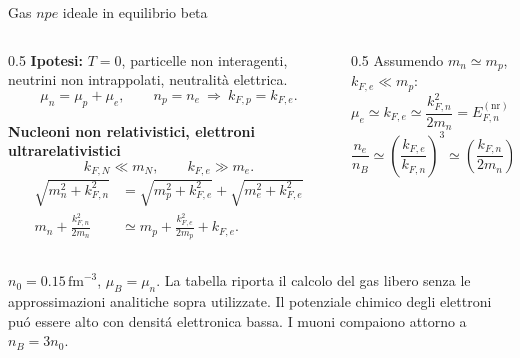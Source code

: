 \begin{frame}{Gas \(npe\) ideale in equilibrio beta}


\begin{columns}[T]
    \begin{column}{0.5\textwidth}
\textbf{Ipotesi:} \(T=0\), particelle non interagenti, neutrini non intrappolati, neutralità elettrica.
\[
\mu_n=\mu_p+\mu_e,\qquad
n_p=n_e \ \Rightarrow\ k_{F,p}=k_{F,e}.
\]

\textbf{Nucleoni non relativistici, elettroni ultrarelativistici}
\[
k_{F,N}\ll m_N,\qquad k_{F,e}\gg m_e.
\]
\vspace{-0.3cm}
\begin{align*}
\sqrt{m_n^2+k_{F,n}^2}
&=\sqrt{m_p^2+k_{F,e}^2}
 +\sqrt{m_e^2+k_{F,e}^2}\\
m_n+\frac{k_{F,n}^2}{2m_n}
&\simeq m_p+\frac{k_{F,e}^2}{2m_p}+k_{F,e}.
\end{align*}
    \end{column}
    \begin{column}{0.5\textwidth}
        Assumendo \(m_n\simeq m_p\), \(k_{F,e}\ll m_p\):
\[
\mu_e\simeq k_{F,e}
\simeq\frac{k_{F,n}^2}{2m_n}
=E_{F,n}^{(\mathrm{nr})}
\simeq56\,\mathrm{MeV}
\left(\frac{n_B}{n_0}\right)^{2/3}
\]
\[
\frac{n_e}{n_B}
\simeq\left(\frac{k_{F,e}}{k_{F,n}}\right)^3
\simeq\left(\frac{k_{F,n}}{2m_n}\right)^3
\simeq5.1\times10^{-3}\frac{n_B}{n_0}.
\]
    \end{column}
\end{columns}

\begin{table}
\centering
\scriptsize
{}
\end{table}
\vspace{-0.3cm}
{\scriptsize
\(n_0=0.15\,\mathrm{fm}^{-3}\), \(\mu_B=\mu_n\).
La tabella riporta il calcolo del gas libero
senza le approssimazioni analitiche sopra utilizzate.
}
Il potenziale chimico degli elettroni pu\'o essere alto con densit\'a elettronica bassa. I muoni compaiono attorno a $n_B=3n_0$.
\end{frame}


